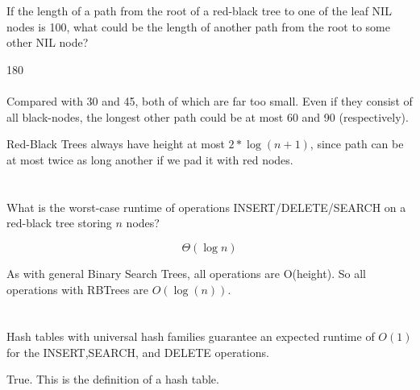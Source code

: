 \documentclass [12pt]{article}
\begin{document}
\section{} If the length of a path from the root of a red-black tree to one of the leaf NIL nodes is 100, what could be the length of another path from the root to some other NIL node?

\begin{Solution}
180
\paragraph{}
Compared with 30 and 45, both of which are far too small. Even if they consist of all black-nodes, the longest other path could be at most 60 and 90 (respectively).

Red-Black Trees always have height at most $2*\log(n+1)$, since path can be at most twice as long another if we pad it with red nodes.
\end{Solution}


\section{} What is the worst-case runtime of operations INSERT/DELETE/SEARCH on a red-black tree storing $n$ nodes?

\begin{Solution}
$$\Theta(\log n)$$

As with general Binary Search Trees, all operations are O(height). So all operations with RBTrees are $O(\log(n))$.
\end{Solution}


\section{} Hash tables with universal hash families guarantee an expected runtime of $O(1)$ for the INSERT,SEARCH, and DELETE operations. 

\begin{Solution}
True. This is the definition of a hash table.
\end{Solution}
\end{document}

